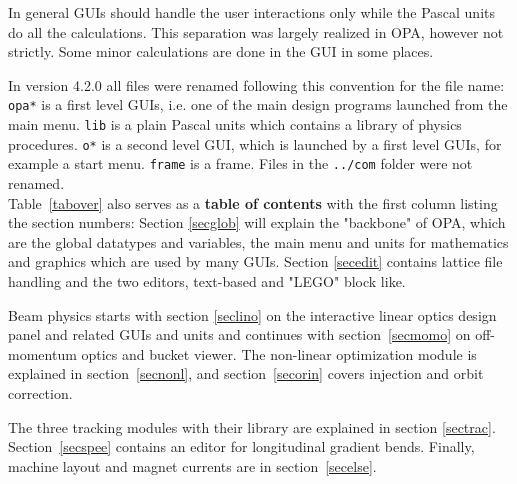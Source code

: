 \documentclass[12pt]{article}
\newcommand\code[1]{{\tt #1}}
\begin{document}
In general GUIs should handle the user interactions only while the Pascal units do all the calculations. This separation was largely realized in OPA, however not strictly. Some minor calculations are done in the GUI in some places.

In version 4.2.0 all files were renamed following this convention for the file name: 
\code{opa*} is a first level GUIs, i.e. one of the main design programs launched from the main menu. \code{*lib} is a plain Pascal units which contains a library of physics procedures. 
\code{o*} is a second level GUI, which is launched by a first level GUIs, for example a start menu. \code{*frame} is a frame. Files in the \code{../com} folder were not renamed. \\

Table~\ref{tabover} also serves as a {\bf table of contents} with the first column listing the section numbers:
Section \ref{secglob} will explain the "backbone" of OPA, which are the global datatypes and variables, the main menu and units for mathematics and graphics which are used by many GUIs. 
Section \ref{secedit} contains lattice file handling and the two editors, text-based and "LEGO" block like.

Beam physics starts with section \ref{seclino} on the interactive linear optics design panel and related GUIs and units and continues with section~\ref{secmomo} on off-momentum optics and bucket viewer. The non-linear optimization module is explained in section~\ref{secnonl}, and section~\ref{secorin} covers injection and orbit correction.

The three tracking modules with their library are explained in section \ref{sectrac}. Section~\ref{secspee} contains an editor for longitudinal gradient bends. Finally, machine layout and magnet currents are in section~\ref{secelse}.
\end{document}
